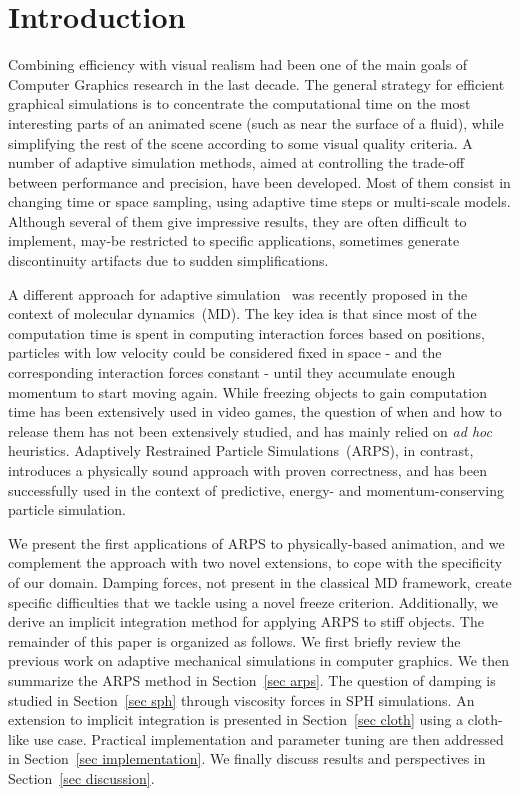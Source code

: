 \section{Introduction}
Combining efficiency with visual realism had been one of the main goals of Computer Graphics research in the last decade. The general strategy for efficient graphical simulations is to concentrate the computational time on the most interesting parts of an animated scene (such as near the surface of a fluid), while simplifying the rest of the scene according to some visual quality criteria. A number of adaptive simulation methods, aimed at controlling the trade-off between performance and precision, have been developed. Most of them consist in changing time or space sampling, using adaptive time steps or multi-scale models.
Although several of them give impressive results, they are often difficult to implement, may-be restricted to specific applications, sometimes generate discontinuity artifacts due to sudden simplifications.

A different approach for adaptive simulation~\cite{Artemova2012} was recently proposed in the context of molecular dynamics~(MD).
The key idea is that since most of the computation time is spent in computing interaction forces based on positions, particles with low velocity could be considered fixed in space - and the corresponding interaction forces constant - until they accumulate enough momentum to start moving again.
While freezing objects to gain computation time has been extensively used in video games, the question of when and how to release them has not been extensively studied, and has mainly relied on \textit{ad hoc} heuristics.
Adaptively Restrained Particle Simulations~(ARPS), in contrast, introduces a physically sound approach with proven correctness, and has been successfully used in the context of predictive, energy- and momentum-conserving particle simulation.

We present the first applications of ARPS to physically-based animation, and we complement the approach with two novel extensions, to cope with the specificity of our domain.
Damping forces, not present in the classical MD framework, create specific difficulties that we tackle using a novel freeze criterion.
Additionally, we derive an implicit integration method for applying ARPS to stiff objects.
The remainder of this paper is organized as follows.
We first briefly review the previous work on adaptive mechanical simulations in computer graphics.
We then summarize the ARPS method in Section~\ref{sec arps}.
The question of damping is studied in Section~\ref{sec sph} through viscosity forces in SPH simulations.
An extension to implicit integration is presented in Section~\ref{sec cloth} using a cloth-like use case.
Practical implementation and parameter tuning are then addressed in Section~\ref{sec implementation}. We finally discuss results and perspectives in Section~\ref{sec discussion}.


